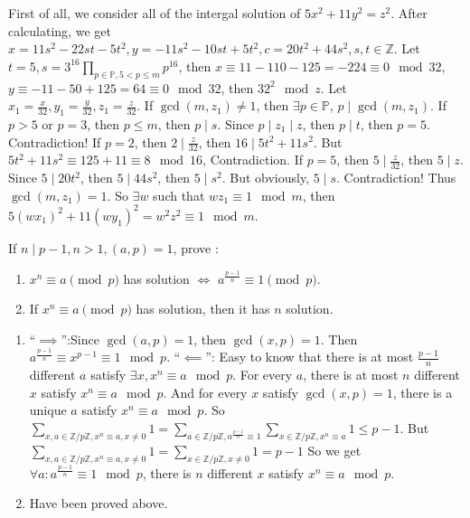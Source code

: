 \documentclass{ctexart}
\begin{document}
\begin{solution}
  First of all, we consider all of the intergal solution of \(5x^2 + 11 y^2 = z^2\).
  After calculating, we get \(x = 11s^2 - 22 st -5 t^2,y=-11s^2 -10st + 5t^2,c=20t^2 + 44s^2, s,t \in \mathbb{Z}\).
  Let \(t = 5, s= 3^{16} \prod_{p \in \mathbb{P},5 < p \leq m} p^{16}\), then \(x \equiv 11 -110-125 =-224 \equiv 0 \mod 32\),
  \(y \equiv -11-50 + 125 =64 \equiv 0 \mod 32\), then \(32^2 \mod z\).
  Let \(x_1=\frac{x}{32},y_1=\frac{y}{32},z_1=\frac{z}{32}\). If \(\gcd(m,z_1) \neq 1\), then \(\exists p \in \mathbb{P}\),
  \(p \mid \gcd(m,z_1)\). If \(p >5 \) or \(p =3\), then \(p \leq m\), then \(p \mid s\).
  Since \(p \mid z_1 \mid z\), then \(p \mid t\), then \(p=5\). Contradiction!
  If \(p=2\), then \(2 \mid \frac{z}{32}\), then \(16 \mid 5t^2 + 11s^2\).
  But \(5t^2 + 11s^2 \equiv 125 + 11 \equiv 8 \mod 16\), Contradiction.
  If \(p=5\), then \(5 \mid \frac{z}{32}\), then \(5 \mid z\).
  Since \(5 \mid 20t^2 \), then \(5 \mid 44s^2\), then \(5 \mid s^2\).
  But obviously, \(5 \mid s\). Contradiction!
  Thus \(\gcd(m,z_1)=1\). So \(\exists w\) such that \(w z_1 \equiv 1 \mod m\), then \(5(w x_1)^2 + 11 (w y_1)^2 = w^2z^2 \equiv 1 \mod m\).
\end{solution}

\begin{problem}\label{pro:4}
  If \(n \mid p-1, n > 1,(a,p)=1\), prove :
  \begin{enumerate}
    \item \(x^n \equiv a \pmod{ p}\) has solution \(\iff\) \(a^{\frac{p-1}{n}} \equiv 1 \pmod{ p}\).
    \item If \(x^n \equiv a \pmod{ p}\) has solution, then it has \(n\) solution.
  \end{enumerate}
\end{problem}
\begin{solution}
  \begin{enumerate}
    \item ``\(\implies\)'':Since \(\gcd(a,p)=1\), then \(\gcd(x,p)=1\). Then \(a^{\frac{p-1}{n}} \equiv x^{p-1} \equiv 1 \mod p\).
      ``\(\impliedby\)'': Easy to know that there is at most \(\frac{p-1}{n}\) different \(a\) satisfy \(\exists x,x^n \equiv a \mod p\).
      For every \(a\), there is at most \(n\) different \(x\) satisfy \(x^n \equiv a \mod p\).
      And for every \(x\) satisfy \(\gcd(x,p)=1\), there is a unique \(a\) satisfy \(x^n \equiv a \mod p\).
      So \(\sum_{x,a \in \mathbb{Z} / p \mathbb{Z},x^n \equiv a,x \neq 0}1=\sum_{a \in \mathbb{Z} / p \mathbb{Z},a^{\frac{p-1}{n}} \equiv 1}\sum_{x \in \mathbb{Z} / p \mathbb{Z},x^n \equiv a}1 \leq p-1\).
      But \(\sum_{x,a \in \mathbb{Z} / p \mathbb{Z},x^n \equiv a,x \neq 0}1=\sum_{x \in \mathbb{Z} / p \mathbb{Z},x \neq 0} 1 = p-1\)
      So we get \(\forall a:a^{\frac{p-1}{n}}\equiv 1 \mod p\), there is \(n\) different \(x\) satisfy \(x^n \equiv a \mod p\).
    \item Have been proved above.
  \end{enumerate}

\end{solution}
\end{document}
